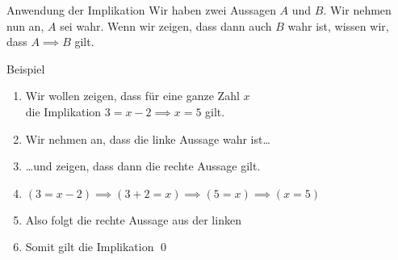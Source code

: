 \begin{frame}{Anwendung der Implikation}
    Wir haben zwei Aussagen $A$ und $B$. Wir nehmen nun an, $A$ sei wahr. Wenn wir zeigen, dass dann auch $B$ wahr ist, wissen wir, dass $A \implies B$ gilt.
\begin{exampleblock}{Beispiel}
\begin{enumerate}
    \item<1-> Wir wollen zeigen, dass für eine ganze Zahl $x$ \\
    die Implikation $3 = x - 2 \implies x = 5$ gilt.
    \item<2-> Wir nehmen an, dass die linke Aussage wahr ist\dots
    \item<3-> \dots und zeigen, dass dann die rechte Aussage gilt.
    \item<4-> $(3 = x - 2) \implies (3 + 2 = x) \implies (5 = x) \implies (x = 5)$
    \item<5-> Also folgt die rechte Aussage aus der linken
    \item<6-> Somit gilt die Implikation \qed\;
\end{enumerate}
\end{exampleblock}
\end{frame}



